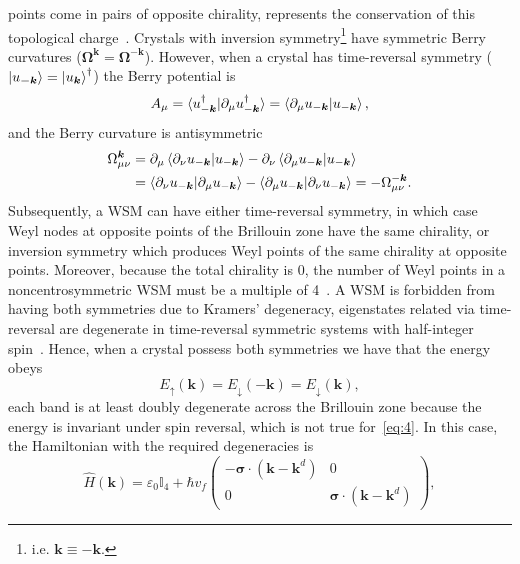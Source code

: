 \documentclass[11pt, a4paper]{article}
\begin{document}
points come in pairs of opposite chirality, represents the conservation
of this topological charge~\cite{Nielsen-Ninomiya}.
Crystals with inversion symmetry\footnote{i.e. $\bm{k}\equiv -\bm{k}$.} have 
symmetric Berry curvatures ($\bm{\Omega^k} = \bm{\Omega}^{-\bm{k}} $).
However, when a crystal has time-reversal symmetry ($\ket{u_{\bm{-k}}} = \ket{u_{\bm{k}}}^\dagger$)
the Berry potential is
\begin{equation}
  A_\mu = \braket{u_{-\bm{k}}^\dagger|\partial_\mu u_{-\bm{k}}^\dagger}
  = \braket{\partial_\mu u_{-\bm{k}}| u_{-\bm{k}}},
\end{equation}
and the Berry curvature is antisymmetric
\begin{equation}
\begin{split}
  \Omega^{\bm{k}}_{\mu\nu} &= \partial_\mu \braket{\partial_\nu u_{-\bm{k}}| u_{-\bm{k}}}
  - \partial_\nu 
  \braket{\partial_\mu u_{-\bm{k}}| u_{-\bm{k}}} \\
        & = \braket{\partial_\nu u_{-\bm{k}}| \partial_\mu u_{-\bm{k}}} -
        \braket{\partial_\mu u_{-\bm{k}}| \partial_\nu u_{-\bm{k}}} = -\Omega^{-\bm{k}}_{\mu\nu}.
\end{split}
\end{equation}
Subsequently, a WSM can have either time-reversal symmetry, in which case Weyl nodes at
opposite points of the Brillouin zone have the same chirality, or inversion symmetry which
produces Weyl points of the same chirality at opposite points.
Moreover, because the total chirality is 0, the number
of Weyl points in a noncentrosymmetric WSM must be a multiple of 4~\cite{WSMreview}.
A WSM is forbidden from having both symmetries due to Kramers' degeneracy,
eigenstates related via time-reversal are degenerate in time-reversal symmetric systems
with half-integer spin~\cite{Kramers}. Hence, when a crystal possess both symmetries we have
that the energy obeys
\begin{equation}
  E_{\uparrow}(\bm{k}) = E_{\downarrow}(-\bm{k}) = E_{\downarrow}(\bm{k}),
\end{equation}
each band is at least doubly degenerate across the Brillouin zone because the
energy is invariant under spin reversal,
which is not true for~\eqref{eq:4}.
In this case, the Hamiltonian with the required degeneracies is
\begin{equation}
  \widehat{H}(\bm{k}) = \varepsilon_0 \mathbb{I}_4 + \hbar v_{\! f}
  \begin{pmatrix} -\bm{\sigma \cdot} (\bm{k}- \bm{k}^d) & 0 \\
  0 & \bm{\sigma \cdot} (\bm{k} - \bm{k}^d)  \end{pmatrix},
\end{equation}
\end{document}

